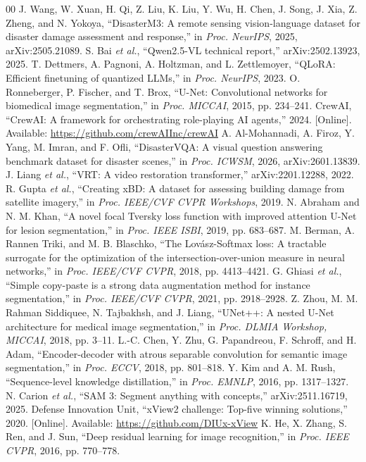 \documentclass[conference]{IEEEtran}
\begin{document}
\newpage
\begin{thebibliography}{00}
 J. Wang, W. Xuan, H. Qi, Z. Liu, K. Liu, Y. Wu, H. Chen, J. Song, J. Xia, Z. Zheng, and N. Yokoya, ``DisasterM3: A remote sensing vision-language dataset for disaster damage assessment and response,'' in \textit{Proc. NeurIPS}, 2025, arXiv:2505.21089.
 S. Bai \textit{et al.}, ``Qwen2.5-VL technical report,'' arXiv:2502.13923, 2025.
 T. Dettmers, A. Pagnoni, A. Holtzman, and L. Zettlemoyer, ``QLoRA: Efficient finetuning of quantized LLMs,'' in \textit{Proc. NeurIPS}, 2023.
 O. Ronneberger, P. Fischer, and T. Brox, ``U-Net: Convolutional networks for biomedical image segmentation,'' in \textit{Proc. MICCAI}, 2015, pp. 234--241.
 CrewAI, ``CrewAI: A framework for orchestrating role-playing AI agents,'' 2024. [Online]. Available: \url{https://github.com/crewAIInc/crewAI}
 A. Al-Mohannadi, A. Firoz, Y. Yang, M. Imran, and F. Ofli, ``DisasterVQA: A visual question answering benchmark dataset for disaster scenes,'' in \textit{Proc. ICWSM}, 2026, arXiv:2601.13839.
 J. Liang \textit{et al.}, ``VRT: A video restoration transformer,'' arXiv:2201.12288, 2022.
 R. Gupta \textit{et al.}, ``Creating xBD: A dataset for assessing building damage from satellite imagery,'' in \textit{Proc. IEEE/CVF CVPR Workshops}, 2019.
 N. Abraham and N. M. Khan, ``A novel focal Tversky loss function with improved attention U-Net for lesion segmentation,'' in \textit{Proc. IEEE ISBI}, 2019, pp. 683--687.
 M. Berman, A. Rannen Triki, and M. B. Blaschko, ``The Lov\'asz-Softmax loss: A tractable surrogate for the optimization of the intersection-over-union measure in neural networks,'' in \textit{Proc. IEEE/CVF CVPR}, 2018, pp. 4413--4421.
 G. Ghiasi \textit{et al.}, ``Simple copy-paste is a strong data augmentation method for instance segmentation,'' in \textit{Proc. IEEE/CVF CVPR}, 2021, pp. 2918--2928.
 Z. Zhou, M. M. Rahman Siddiquee, N. Tajbakhsh, and J. Liang, ``UNet++: A nested U-Net architecture for medical image segmentation,'' in \textit{Proc. DLMIA Workshop, MICCAI}, 2018, pp. 3--11.
 L.-C. Chen, Y. Zhu, G. Papandreou, F. Schroff, and H. Adam, ``Encoder-decoder with atrous separable convolution for semantic image segmentation,'' in \textit{Proc. ECCV}, 2018, pp. 801--818.
 Y. Kim and A. M. Rush, ``Sequence-level knowledge distillation,'' in \textit{Proc. EMNLP}, 2016, pp. 1317--1327.
 N. Carion \textit{et al.}, ``SAM 3: Segment anything with concepts,'' arXiv:2511.16719, 2025.
 Defense Innovation Unit, ``xView2 challenge: Top-five winning solutions,'' 2020. [Online]. Available: \url{https://github.com/DIUx-xView}
 K. He, X. Zhang, S. Ren, and J. Sun, ``Deep residual learning for image recognition,'' in \textit{Proc. IEEE CVPR}, 2016, pp. 770--778.
\end{thebibliography}
\end{document}
